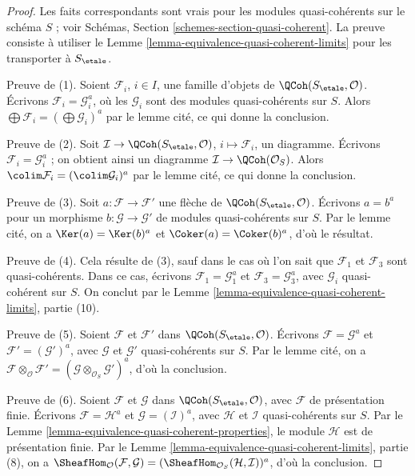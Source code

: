 \begin{proof}
Les faits correspondants sont vrais pour les modules quasi-cohérents sur le
schéma $S$ ; voir Schémas, Section
\ref{schemes-section-quasi-coherent}. La preuve consiste à utiliser le
Lemme \ref{lemma-equivalence-quasi-coherent-limits} pour les transporter à
$S_\etale$.

\medskip\noindent
Preuve de (1). Soient $\mathcal{F}_i$, $i \in I$, une famille d'objets de
$\QCoh(S_\etale, \mathcal{O})$. Écrivons
$\mathcal{F}_i = \mathcal{G}_i^a$, où les $\mathcal{G}_i$ sont des modules
quasi-cohérents sur $S$. Alors
$\bigoplus \mathcal{F}_i = (\bigoplus \mathcal{G}_i)^a$ par le lemme cité,
ce qui donne la conclusion.

\medskip\noindent
Preuve de (2). Soit
$\mathcal{I} \to \QCoh(S_\etale, \mathcal{O})$,
$i \mapsto \mathcal{F}_i$, un diagramme. Écrivons
$\mathcal{F}_i = \mathcal{G}_i^a$ ; on obtient ainsi un diagramme
$\mathcal{I} \to \QCoh(\mathcal{O}_S)$. Alors
$\colim \mathcal{F}_i = (\colim \mathcal{G}_i)^a$ par le lemme cité,
ce qui donne la conclusion.

\medskip\noindent
Preuve de (3). Soit $a : \mathcal{F} \to \mathcal{F}'$ une flèche de
$\QCoh(S_\etale, \mathcal{O})$. Écrivons $a = b^a$ pour un morphisme
$b : \mathcal{G} \to \mathcal{G}'$ de modules quasi-cohérents sur $S$.
Par le lemme cité, on a $\Ker(a) = \Ker(b)^a$ et
$\Coker(a) = \Coker(b)^a$, d'où le résultat.

\medskip\noindent
Preuve de (4). Cela résulte de (3), sauf dans le cas où l'on sait que
$\mathcal{F}_1$ et $\mathcal{F}_3$ sont quasi-cohérents. Dans ce cas,
écrivons $\mathcal{F}_1 = \mathcal{G}_1^a$ et
$\mathcal{F}_3 = \mathcal{G}_3^a$, avec $\mathcal{G}_i$ quasi-cohérent sur
$S$. On conclut par le Lemme
\ref{lemma-equivalence-quasi-coherent-limits}, partie (10).

\medskip\noindent
Preuve de (5). Soient $\mathcal{F}$ et $\mathcal{F}'$ dans
$\QCoh(S_\etale, \mathcal{O})$. Écrivons
$\mathcal{F} = \mathcal{G}^a$ et
$\mathcal{F}' = (\mathcal{G}')^a$, avec $\mathcal{G}$ et $\mathcal{G}'$
quasi-cohérents sur $S$. Par le lemme cité, on a
$\mathcal{F} \otimes_\mathcal{O} \mathcal{F}' =
(\mathcal{G} \otimes_{\mathcal{O}_S} \mathcal{G}')^a$,
d'où la conclusion.

\medskip\noindent
Preuve de (6). Soient $\mathcal{F}$ et $\mathcal{G}$ dans
$\QCoh(S_\etale, \mathcal{O})$, avec $\mathcal{F}$ de présentation finie.
Écrivons $\mathcal{F} = \mathcal{H}^a$ et
$\mathcal{G} = (\mathcal{I})^a$, avec $\mathcal{H}$ et $\mathcal{I}$
quasi-cohérents sur $S$. Par le
Lemme \ref{lemma-equivalence-quasi-coherent-properties}, le module
$\mathcal{H}$ est de présentation finie. Par le
Lemme \ref{lemma-equivalence-quasi-coherent-limits}, partie (8), on a
$\SheafHom_\mathcal{O}(\mathcal{F}, \mathcal{G}) =
(\SheafHom_{\mathcal{O}_S}(\mathcal{H}, \mathcal{I}))^a$,
d'où la conclusion.
\end{proof}

